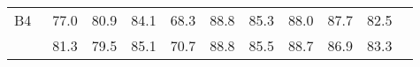 \documentclass[9pt,journal,letterpaper,twocolumn]{IEEEtran}
\begin{document}
{\begin{table}[!t]
{\begin{tabular}{lcccccccccc}
			\hspace{-0.5em}B4 & \hspace{-0.5em}~77.0\hspace{-0.5em}&	\hspace{-0.5em}80.9\hspace{-0.5em}&	\hspace{-0.5em}84.1\hspace{-0.5em}&	\hspace{-0.5em}68.3\hspace{-0.5em}&	\hspace{-0.5em}88.8\hspace{-0.5em}&	\hspace{-0.5em}85.3\hspace{-0.5em}&	\hspace{-0.5em}88.0\hspace{-0.5em}&	\hspace{-0.5em}87.7\hspace{-0.5em}&	\hspace{-0.5em}82.5\hspace{-0.5em}	
			\\
			\hspace{-0.5em}{Co-LSTSM+} & \hspace{-0.5em}~81.3\hspace{-0.5em}& 	\hspace{-0.5em}79.5\hspace{-0.5em}&	\hspace{-0.5em}85.1\hspace{-0.5em}&	\hspace{-0.5em}70.7\hspace{-0.5em}&	\hspace{-0.5em}88.8\hspace{-0.5em}&	\hspace{-0.5em}85.5\hspace{-0.5em}&	\hspace{-0.5em}88.7\hspace{-0.5em}&	\hspace{-0.5em}86.9\hspace{-0.5em}&	\hspace{-0.5em}83.3\hspace{-0.5em}
			\\

\end{tabular}}
\end{table}}
\end{document}
